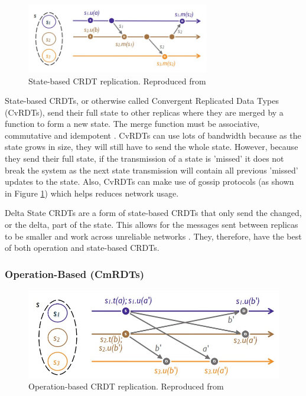 \documentclass[12pt]{article}
\begin{document}
\begin{figure}
    \centering
    \includegraphics[width=8cm]{state.jpg}
    \caption{State-based CRDT replication. Reproduced from \cite{10.1007/978-3-642-24550-3_29}}
    \label{fig:statebased}
\end{figure}

State-based CRDTs, or otherwise called Convergent Replicated Data Types (CvRDTs), send their full state to other replicas where they are merged by a function to form a new state. The merge function must be associative, commutative and idempotent \cite{10.1007/978-3-642-24550-3_29}. CvRDTs can use lots of bandwidth because as the state grows in size, they will still have to send the whole state. However, because they send their full state, if the transmission of a state is 'missed' it does not break the system as the next state transmission will contain all previous 'missed' updates to the state. Also, CvRDTs can make use of gossip protocols (as shown in Figure \ref{fig:statebased}) which helps reduces network usage. \par

Delta State CRDTs are a form of state-based CRDTs that only send the changed, or the delta, part of the state. This allows for the messages sent between replicas to be smaller and work across unreliable networks \cite{Almeida_2018}. They, therefore, have the best of both operation and state-based CRDTs.


\subsubsection{Operation-Based (CmRDTs)}

\begin{figure}
    \centering
    \includegraphics[width=8 cm]{operation.jpg}
    \caption{Operation-based CRDT replication. Reproduced from \cite{10.1007/978-3-642-24550-3_29}}
    \label{fig:operation}
\end{figure}
\end{document}
